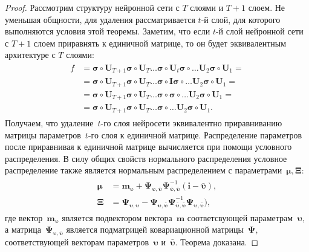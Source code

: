 \documentclass[12pt]{a&t}
\begin{document}
\begin{proof}
Рассмотрим структуру нейронной сети с $T$ слоями и $T+1$ слоем. Не уменьшая общности, для удаления рассматривается $t$-й слой, для которого выполняются условия этой теоремы. Заметим, что если $t$-й слой нейронной сети с $T+1$ слоем приравнять к единичной матрице, то он будет эквивалентным архитектуре с $T$ слоями:
\begin{gather}
\label{eq:ap:tr:2:1}
\begin{aligned}
f &= \bm{\sigma} \circ \mathbf{U}_{T+1}\bm{\sigma} \circ \mathbf{U}_T \ldots \bm{\sigma} \circ \mathbf{U}_t\bm{\sigma} \circ \ldots  \mathbf{U}_2\bm{\sigma} \circ \mathbf{U}_1 =\\
&=  \bm{\sigma} \circ \mathbf{U}_{T+1}\bm{\sigma} \circ \mathbf{U}_T \ldots \bm{\sigma} \circ \mathbf{I}\bm{\sigma} \circ \ldots  \mathbf{U}_2\bm{\sigma} \circ \mathbf{U}_1 =\\
&=  \bm{\sigma} \circ \mathbf{U}_{T+1}\bm{\sigma} \circ \mathbf{U}_T \ldots \bm{\sigma} \circ \bm{\sigma} \circ \ldots  \mathbf{U}_2\bm{\sigma} \circ \mathbf{U}_1 =\\
&=  \bm{\sigma} \circ \mathbf{U}_{T+1}\bm{\sigma} \circ \mathbf{U}_T \ldots \bm{\sigma} \circ \ldots  \mathbf{U}_2\bm{\sigma} \circ \mathbf{U}_1.
\end{aligned}
\end{gather}
Получаем, что удаление~$t$-го слоя нейросети эквивалентно приравниванию матрицы параметров~$t$-го слоя к единичной матрице. Распределение параметров после приравнивая к единичной матрице вычисляется при помощи условного распределения. В силу общих свойств нормального распределения условное распределение также является нормальным распределением с параметрами~$\bm{\mu}, \bm{\Xi}:$
\begin{gather}
\label{eq:ap:tr:2:2}
\begin{aligned}
\bm{\mu} &= \mathbf{m}_{\bm{\upsilon}}+\bm{\Psi}_{\bm{\upsilon},\bar{\bm{\upsilon}}} \bm{\Psi}_{\bar{\bm{\upsilon}},\bar{\bm{\upsilon}}}^{-1} \left(\mathbf{i} - \bar{\bm{\upsilon}}\right), \\
\bm{\Xi} &= \bm{\Psi}_{\bm{\upsilon},\bm{\upsilon}} - \bm{\Psi}_{\bm{\upsilon},\bar{\bm{\upsilon}}}\bm{\Psi}_{\bar{\bm{\upsilon}},\bar{\bm{\upsilon}}}^{-1}\bm{\Psi}_{\bm{\upsilon},\bar{\bm{\upsilon}}}\bigr),
\end{aligned}
\end{gather}
где вектор~$\mathbf{m}_{\bm{\upsilon}}$ является подвектором вектора~$\mathbf{m}$ соответсвующей параметрам~$\bm{\upsilon},$ а матрица~$\bm{\Psi}_{\bm{\upsilon},\bar{\bm{\upsilon}}}$ является подматрицей ковариационной матрицы~$\bm{\Psi},$ соответствующей векторам параметров~$\bm{\upsilon}$ и~$\bar{\bm{\upsilon}}.$ Теорема доказана.
\end{proof}
\end{document}
